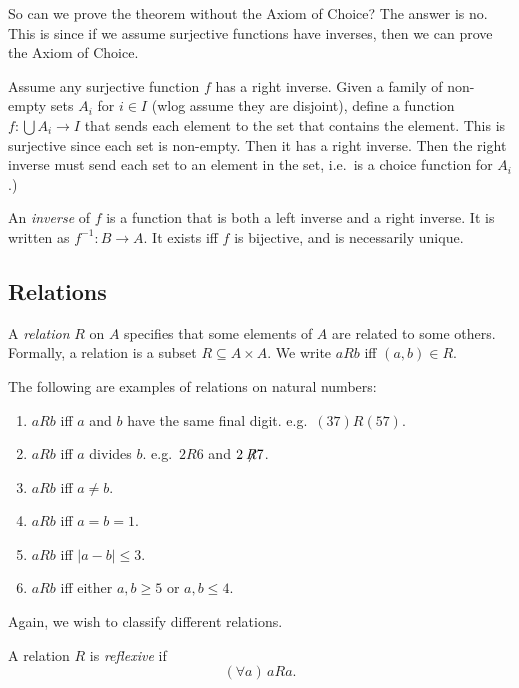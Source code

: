 \documentclass[a4paper]{article}
\begin{document}
So can we prove the theorem without the Axiom of Choice? The answer is no. This is since if we assume surjective functions have inverses, then we can prove the Axiom of Choice.

Assume any surjective function $f$ has a right inverse. Given a family of non-empty sets $A_i$ for $i\in I$ (wlog assume they are disjoint), define a function $f: \bigcup A_i \to I$ that sends each element to the set that contains the element. This is surjective since each set is non-empty. Then it has a right inverse. Then the right inverse must send each set to an element in the set, i.e.\ is a choice function for $A_i$.)


\begin{defi}
  An \emph{inverse} of $f$ is a function that is both a left inverse and a right inverse. It is written as $f^{-1}: B\to A$. It exists iff $f$ is bijective, and is necessarily unique.
\end{defi}

\subsection{Relations}
\begin{defi}[Relation]
  A \emph{relation} $R$ on $A$ specifies that some elements of $A$ are related to some others. Formally, a relation is a subset $R\subseteq A\times A$. We write $aRb$ iff $(a, b)\in R$.
\end{defi}

\begin{eg}
  The following are examples of relations on natural numbers:
  \begin{enumerate}
    \item $aRb$ iff $a$ and $b$ have the same final digit. e.g.\ $(37)R(57)$.
    \item $aRb$ iff $a$ divides $b$. e.g.\ $2R6$ and $2\not \!\!R 7$.
    \item $aRb$ iff $a\not= b$.
    \item $aRb$ iff $a = b = 1$.
    \item $aRb$ iff $|a - b|\leq 3$.
    \item $aRb$ iff either $a, b\geq 5$ or $a, b\leq 4$.
  \end{enumerate}
\end{eg}

Again, we wish to classify different relations.
\begin{defi}
  A relation $R$ is \emph{reflexive} if
  \[
    (\forall a)\,aRa.
  \]
\end{defi}
\end{document}
